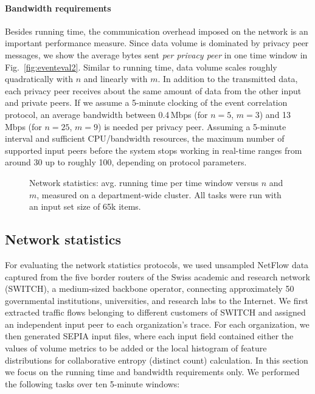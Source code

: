 \documentclass[letterpaper,11pt,onecolumn,titlepage]{article}
\begin{document}
\paragraph{Bandwidth requirements}
Besides running time, the communication overhead imposed on the network is an important performance measure. 
Since data volume is dominated by privacy peer messages, we show the average bytes sent
\emph{per privacy peer} in one time window in Fig.~\ref{fig:eventeval2}. Similar to
running time, data volume scales roughly quadratically with $n$ and linearly with $m$.
In addition to the transmitted data, each privacy peer receives about the same amount of data from
the other input and private peers. 
If we assume a 5-minute clocking of the event correlation protocol, an average bandwidth between 0.4\,Mbps (for $n=5$, $m=3$) and
13\,Mbps (for $n=25$, $m=9$) is needed per privacy peer.
Assuming a 5-minute interval and sufficient CPU/bandwidth resources, the maximum number of supported input peers before the system stops working in real-time ranges from around 30 up to roughly 100, depending on protocol parameters.


\begin{figure*}[t]
  \centering
	
	\caption{Network statistics: avg. running time per time window versus $n$ and $m$, measured on a department-wide cluster. 
	All tasks	were run with an input set size of 65k items.}
	\label{fig:statistics}
\end{figure*}


\subsection{Network statistics}
\label{sec:eval_stats}

For evaluating the network statistics protocols, we used unsampled NetFlow data captured from 
the five border routers of the Swiss academic and research network (SWITCH), 
a medium-sized backbone operator, connecting
approximately 50 governmental institutions, universities, and research
labs to the Internet. We first extracted traffic
flows belonging to different customers of SWITCH and assigned an independent input peer to each organization's trace. 
For each organization, we then generated SEPIA input files, where each input field contained either the values
of volume metrics to be added or the local histogram of feature
distributions for collaborative entropy (distinct
count) calculation. In this section we focus on the running time and bandwidth requirements only.
We performed the following tasks over ten 5-minute windows:
\end{document}
